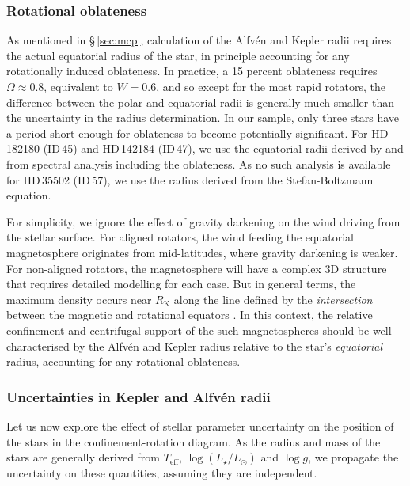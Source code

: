 \documentclass[useAMS,usenatbib]{mn2e}
\newcommand{\rk}{R_\mathrm{K}}
\newcommand{\teff}{T_\mathrm{eff}}
\newcommand{\lum}{\log(L_\star/L_\odot)}
\newcommand{\logg}{\log g}
\begin{document}
\subsubsection{Rotational oblateness}
\label{sec:oblate}


As mentioned in \S\,\ref{sec:mcp}, calculation of the Alfv\'en and Kepler radii requires the actual equatorial radius of the  star, in principle accounting for any rotationally induced oblateness. In practice, a 15 percent oblateness requires $\Omega\approx 0.8$, equivalent to $W=0.6$, and so except for the most rapid rotators, the difference between the polar and equatorial radii is generally much smaller than the uncertainty in the radius determination.
In our sample, only three stars have a period short enough for oblateness to become potentially significant.
For HD\,182180 (ID\,45) and HD\,142184 (ID\,47), we use the equatorial radii derived by \citet{RiviniusHR7355_sub} and \citet{2012MNRAS.419.1610G} from spectral analysis including the oblateness. 
As no such analysis is available for HD\,35502 (ID\,57), we use the radius derived from the Stefan-Boltzmann equation.

For simplicity, we ignore the effect of gravity darkening on the wind driving from the stellar surface.
For aligned rotators, the wind feeding the equatorial magnetosphere originates from mid-latitudes, where gravity darkening is weaker.
For non-aligned rotators, the magnetosphere will have a complex 3D structure that requires detailed modelling for each case.
But in general terms, the maximum density occurs near $\rk$ along the line defined by the \textit{intersection} between the magnetic and rotational equators \citep{2005MNRAS.357..251T,2005ApJ...630L..81T}.
In this context, the relative confinement and centrifugal support of the such magnetospheres should be well characterised by the Alfv\'{e}n and Kepler radius relative to the star's \textit{equatorial} radius, accounting for any rotational oblateness.



\subsubsection{Uncertainties  in Kepler and Alfv\'en radii}
\label{sec:error}

Let us now explore the effect of stellar parameter uncertainty on the position of the stars in the confinement-rotation diagram. 
As the radius and mass of the stars are generally derived from $\teff$, $\lum$ and $\logg$, we propagate the uncertainty on these quantities, assuming they are independent. 
\end{document}

